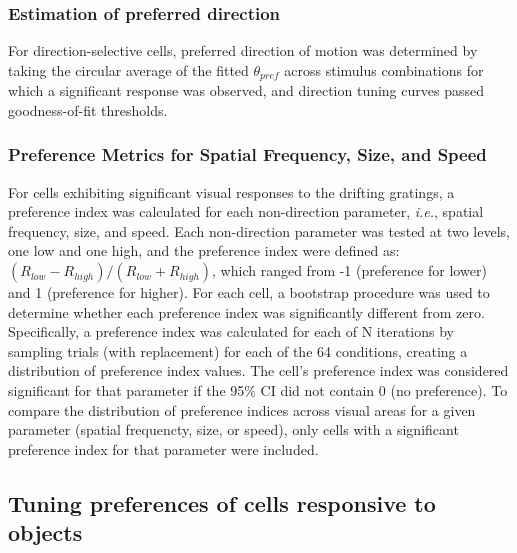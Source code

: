 \subsubsection{Estimation of preferred direction}
For direction-selective cells, preferred direction of motion was determined by taking the circular average of the fitted $\theta_{pref}$ across stimulus combinations for which a significant response was observed, and direction tuning curves passed goodness-of-fit thresholds. 

\subsubsection{Preference Metrics for Spatial Frequency, Size, and Speed}
For cells exhibiting significant visual responses to the drifting gratings, a preference index was calculated for each non-direction parameter, \textit{i.e.}, spatial frequency, size, and speed. Each non-direction parameter was tested at two levels, one low and one high, and the preference index were defined as:  $(R_{low}-R_{high})/(R_{low}+R_{high})$, which ranged from -1 (preference for lower) and 1 (preference for higher). For each cell, a bootstrap procedure was used to determine whether each preference index was significantly different from zero. Specifically, a preference index was calculated for each of N iterations by sampling trials (with replacement) for each of the 64 conditions, creating a distribution of preference index values. The cell's preference index was considered significant for that parameter if the 95\% CI did not contain 0 (no preference). To compare the distribution of preference indices across visual areas for a given parameter (spatial frequencty, size, or speed), only cells with a significant preference index for that parameter were included.

\subsection{Tuning preferences of cells responsive to objects}

